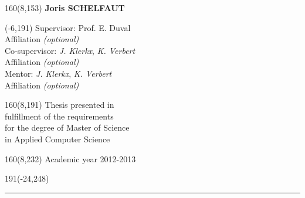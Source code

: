 \documentclass[12pt,a4paper,oneside]{book}
\begin{document}
\begin{textblock}{160}(8,153)
\textblockcolour{}
\vspace{-\parskip}
\flushright
\fontsize{14}{16}\selectfont \textbf{Joris SCHELFAUT}
\end{textblock}
%
\begin{textblock}{70}(-6,191)
\textblockcolour{}
\vspace{-\parskip}
\flushleft
Supervisor: Prof. E. Duval\\[-2pt]
\textcolor{blueaff}{Affiliation \textsl{(optional)}}\\[5pt]
Co-supervisor: \textsl{J. Klerkx}, \textsl{K. Verbert}\\[-2pt]
\textcolor{blueaff}{Affiliation \textsl{(optional)}}\\[5pt]
Mentor: \textsl{J. Klerkx}, \textsl{K. Verbert}\\[-2pt]
\textcolor{blueaff}{Affiliation \textsl{(optional)}}\\
\end{textblock}
%
\begin{textblock}{160}(8,191)
\textblockcolour{}
\vspace{-\parskip}
\flushright
Thesis presented in\\[4.5pt]
fulfillment of the requirements\\[4.5pt]
for the degree of Master of Science\\[4.5pt]
in Applied Computer Science\\
\end{textblock}
%
\begin{textblock}{160}(8,232)
\textblockcolour{}
\vspace{-\parskip}
\flushright
Academic year 2012-2013
\end{textblock}
%
\begin{textblock}{191}(-24,248)
{\color{blueline}\rule{550pt}{5.5pt}}
\end{textblock}
%
\vfill
\newpage






\rmfamily
\setcounter{page}{0}



\end{document}
